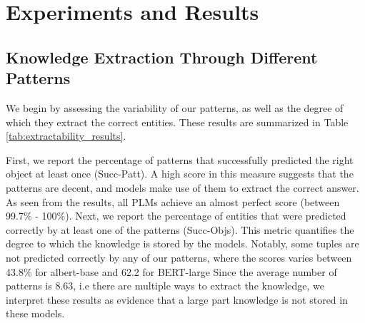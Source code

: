 \section{Experiments and Results}
\label{sec:experiments}


% 



\subsection{Knowledge Extraction Through Different Patterns}




We begin by assessing the variability of our patterns, as well as the degree of which they extract the correct entities. These results are summarized in Table \ref{tab:extractability_results}.

First, we report the percentage of patterns that successfully predicted the right object at least once (Succ-Patt). A high score in this measure suggests that the patterns are decent, and models make use of them to extract the correct answer. As seen from the results, all PLMs achieve an almost perfect score (between 99.7\% - 100\%).
Next, we report the percentage of entities that were predicted correctly by at least one of the patterns (Succ-Objs). 
This metric quantifies the degree to which the knowledge is stored by the models.
Notably, some tuples are not predicted correctly by any of our patterns, where the scores varies between 43.8\% for albert-base and 62.2 for BERT-large
Since the average number of patterns is 8.63, i.e there are multiple ways to extract the knowledge, we interpret these results as evidence that a large part knowledge is not stored in these models. 


